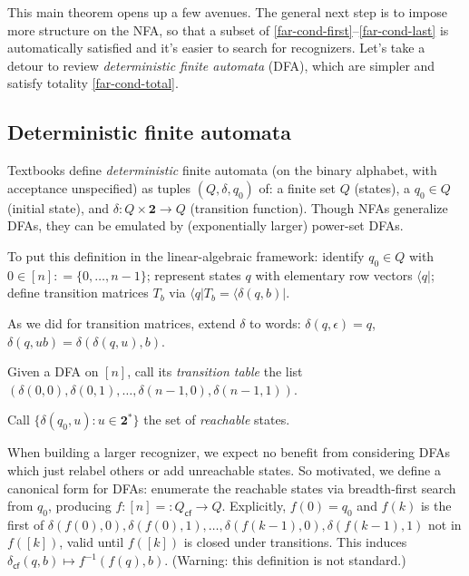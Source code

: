 This main theorem opens up a few avenues.
The general next step is to impose more structure on the NFA, so that a subset of \eqref{far-cond-first}--\eqref{far-cond-last} is automatically satisfied and it's easier to search for recognizers.
Let's take a detour to review \emph{deterministic finite automata} (DFA), which are simpler and satisfy totality \eqref{far-cond-total}.


\subsection{Deterministic finite automata}
\label{far-defs-dfa}
Textbooks define \emph{deterministic} finite automata (on the binary alphabet, with acceptance unspecified) as tuples $(Q, \delta, q_0)$ of: a finite set $Q$ (states), a $q_0\in Q$ (initial state), and $\delta: Q\times\mathbf{2}\to Q$ (transition function).
Though NFAs generalize DFAs, they can be emulated by (exponentially larger) power-set DFAs.

To put this definition in the linear-algebraic framework:
identify $q_0\in Q$ with $0\in [n]\mathrel{\mathop:}=\{0,\ldots,n-1\}$;
represent states $q$ with elementary row vectors $\langle q\vert$;
define transition matrices $T_b$ via $\langle q\vert T_b = \langle \delta(q, b)\vert$.

As we did for transition matrices, extend $\delta$ to words: $\delta(q,\epsilon)=q$, $\delta(q,ub)=\delta(\delta(q,u),b)$.

Given a DFA on $[n]$, call its \emph{transition table} the list $(\delta(0,0),\delta(0,1),\ldots,\delta(n-1,0),\delta(n-1,1))$.

Call $\{\delta(q_0,u): u\in\mathbf{2}^*\}$ the set of \emph{reachable} states.

When building a larger recognizer,
we expect no benefit from considering DFAs which just relabel others or add unreachable states.
So motivated, we define a canonical form for DFAs:
enumerate the reachable states via breadth-first search from $q_0$,
producing $f:[n]=\mathrel{\mathop:}Q_\textsf{cf}\to Q$.
Explicitly,
 $f(0)=q_0$ and $f(k)$ is the first of
 $\delta(f(0),0), \delta(f(0),1), \ldots, \delta(f(k-1),0), \delta(f(k-1),1)$ not in $f([k])$,
 valid until $f([k])$ is closed under transitions.
This induces $\delta_\textsf{cf}(q,b)\mapsto f^{-1}(f(q), b)$.
(Warning: this definition is not standard.)

